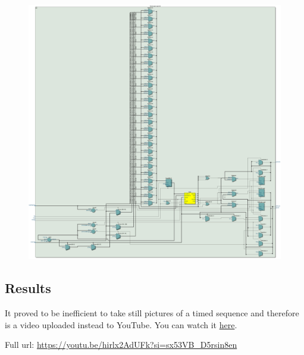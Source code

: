 \documentclass{article}
\begin{document}
\clearpage
\begin{figure}[h]
    \centering
    \includegraphics[width=1\textwidth]{Figures/Part3_RTL_Logic.jpg}
    \label{fig:p3_RTL_Logic}
\end{figure}

\subsection{Results}
It proved to be inefficient to take still pictures of a timed sequence and therefore is a video uploaded instead to YouTube. You can watch it \href{https://youtu.be/hirlx2AdUFk?si=sx53VB_D5rsin8en}{here}. \par
Full url: \url{https://youtu.be/hirlx2AdUFk?si=sx53VB_D5rsin8en}
\end{document}
